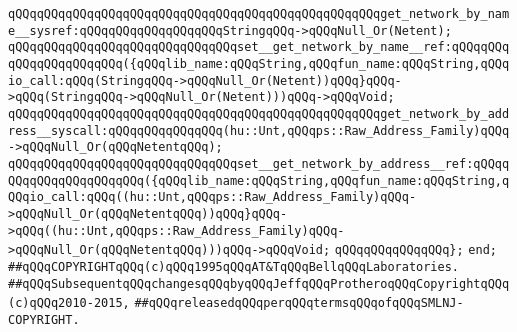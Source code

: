 \newline
\verb|qQQqqQQqqQQqqQQqqQQqqQQqqQQqqQQqqQQqqQQqqQQqqQQqqQQqget_network_by_name__sysref:qQQqqQQqqQQqqQQqqQQqStringqQQq->qQQqNull_Or(Netent);|\newline
\verb|qQQqqQQqqQQqqQQqqQQqqQQqqQQqqQQqset__get_network_by_name__ref:qQQqqQQqqQQqqQQqqQQqqQQq({qQQqlib_name:qQQqString,qQQqfun_name:qQQqString,qQQqio_call:qQQq(StringqQQq->qQQqNull_Or(Netent))qQQq}qQQq->qQQq(StringqQQq->qQQqNull_Or(Netent)))qQQq->qQQqVoid;|\newline
\newline
\verb|qQQqqQQqqQQqqQQqqQQqqQQqqQQqqQQqqQQqqQQqqQQqqQQqqQQqget_network_by_address__syscall:qQQqqQQqqQQqqQQq(hu::Unt,qQQqps::Raw_Address_Family)qQQq->qQQqNull_Or(qQQqNetentqQQq);|\newline
\verb|qQQqqQQqqQQqqQQqqQQqqQQqqQQqqQQqset__get_network_by_address__ref:qQQqqQQqqQQqqQQqqQQqqQQq({qQQqlib_name:qQQqString,qQQqfun_name:qQQqString,qQQqio_call:qQQq((hu::Unt,qQQqps::Raw_Address_Family)qQQq->qQQqNull_Or(qQQqNetentqQQq))qQQq}qQQq->qQQq((hu::Unt,qQQqps::Raw_Address_Family)qQQq->qQQqNull_Or(qQQqNetentqQQq)))qQQq->qQQqVoid;|\newline
\verb|qQQqqQQqqQQqqQQq};|\newline
\verb|end;|\newline
\newline
\newline
\verb|##qQQqCOPYRIGHTqQQq(c)qQQq1995qQQqAT&TqQQqBellqQQqLaboratories.|\newline
\verb|##qQQqSubsequentqQQqchangesqQQqbyqQQqJeffqQQqProtheroqQQqCopyrightqQQq(c)qQQq2010-2015,|\newline
\verb|##qQQqreleasedqQQqperqQQqtermsqQQqofqQQqSMLNJ-COPYRIGHT.|\newline

